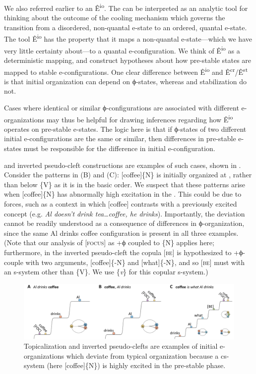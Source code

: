   We also referred earlier to an  Ê\textsuperscript{io}. The  can be interpreted as an analytic tool for thinking about the outcome of the cooling mechanism which governs the transition from a disordered, non-quantal e-state to an ordered, quantal e-state. The tool Ê\textsuperscript{io} has the property that it maps a non-quantal e-state—which we have very little certainty about—to a quantal e-configuration. We think of Ê\textsuperscript{io} as a deterministic mapping, and construct hypotheses about how pre-stable states are mapped to stable e-configurations. One clear difference between Ê\textsuperscript{io} and Ê\textsuperscript{cr}/Ê\textsuperscript{st} is that initial organization can depend on ϕ-states, whereas  and stabilization do not. 

  Cases where identical or similar ϕ-configurations are associated with different e-organizations may thus be helpful for drawing inferences regarding how Ê\textsuperscript{io} operates on pre-stable e-states. The logic here is that if ϕ-states of two different initial e-configurations are the same or similar, then differences in pre-stable e-states must be responsible for the difference in initial e-configuration. 

   and inverted pseudo-cleft constructions are examples of such cases, shown in {}. Consider the patterns in (B) and (C): [coffee]\{N\} is initially organized at , rather than below \{V\} as it is in the basic order. We suspect that these patterns arise when [coffee]\{N\} has abnormally high excitation in the . This could be due to  forces, such as a context in which [coffee] contrasts with a previously excited concept (e.g. \textit{Al doesn't drink tea…coffee, he drinks}). Importantly, the deviation cannot be readily understood as a consequence of differences in ϕ-organization, since the same {\textbar}Al drinks coffee{\textbar} configuration is present in all three examples. (Note that our analysis of [\textsc{focus}] as +ϕ coupled to \{N\} applies here; furthermore, in the inverted pseudo-cleft the copula [\textsc{be}] is hypothesized to +ϕ-couple with two arguments, [coffee]\{-N\} and [what]\{-N\}, and so [\textsc{be}] must  with an s-system other than \{V\}. We use \{\textit{v}\} for this copular s-system.)

  
\begin{figure}
\includegraphics[width=\textwidth]{figures/Tilsen-img78.png}
\caption{Topicalization and inverted pseudo-clefts are examples of initial e-organizations which deviate from typical organization because a cs-system (here [coffee]\{N\}) is highly excited in the pre-stable phase.}
\label{fig:4:28}
\end{figure}
 

